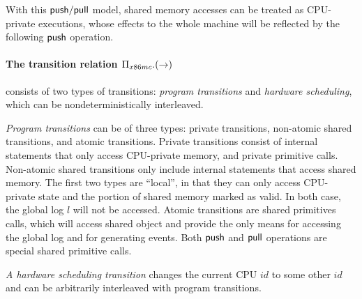 With this $\mathsf{push}/\mathsf{pull}$ model, shared memory accesses
can be treated as CPU-private executions,
whose effects to the whole machine
will be reflected by the following $\mathsf{push}$ operation. 

\paragraph{The transition relation $\Pi_{x86mc}.(\rightarrow)$}
consists of two types of transitions: 
\emph{program transitions} and \emph{hardware scheduling}, which can 
be nondeterministically interleaved.

\emph{Program transitions} can be of three types:
private transitions,
non-atomic shared transitions,
and atomic transitions.
Private transitions consist of
internal statements that only access
CPU-private memory,
and  private primitive calls.
Non-atomic shared transitions
only include 
internal statements that access shared memory.
The first two types are ``local'', 
in that they can only access CPU-private 
state and the portion of shared memory marked as valid.
In both case, the global log $l$ will not be accessed.
Atomic transitions are
shared primitives calls, 
which will access shared object
and provide the only means 
for accessing the global log and for generating events.
Both $\mathsf{push}$ and $\mathsf{pull}$ operations
are special shared primitive calls.

\emph{A hardware scheduling transition} changes the
current CPU $id$ to some other $id$ 
and  can be arbitrarily interleaved with
program transitions.

